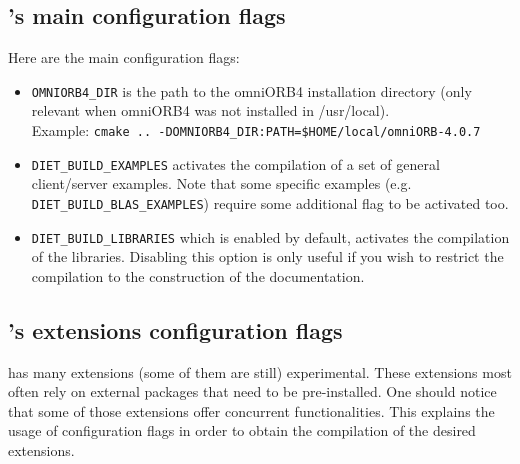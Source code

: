 \subsection{\diet's main configuration flags}

Here are the main configuration flags:
\begin{itemize}
\item
  \verb+OMNIORB4_DIR+ is the path to the omniORB4 installation
  directory (only relevant when omniORB4 was not installed in
  /usr/local).\\ Example:
  \verb+cmake .. -DOMNIORB4_DIR:PATH=$HOME/local/omniORB-4.0.7+

\item
  \verb+DIET_BUILD_EXAMPLES+ activates the compilation of a set of
  general client/server examples. Note that some specific examples
  (e.g. \verb+DIET_BUILD_BLAS_EXAMPLES+) require some additional flag
  to be activated too.

\item
  \verb+DIET_BUILD_LIBRARIES+ which is enabled by default, activates
  the compilation of the \diet libraries. Disabling this option is
  only useful if you wish to restrict the compilation to the
  construction of the documentation.
\end{itemize}

\subsection{\diet's extensions configuration flags}

\diet has many extensions (some of them are still) experimental. These
extensions most often rely on external packages that need to be
pre-installed. One should notice that some of those extensions offer
concurrent functionalities. This explains the usage of configuration
flags in order to obtain the compilation of the desired extensions.

